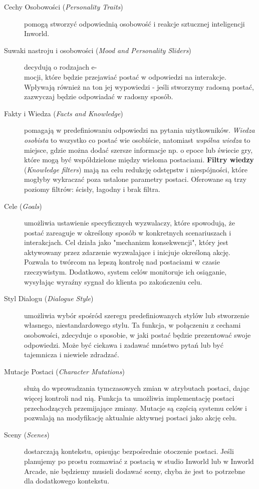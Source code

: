 \begin{description}
\item[Cechy Osobowości (\textit{Personality Traits})] pomogą stworzyć odpowiednią osobowość i reakcje sztucznej
inteligencji Inworld.

\item[Suwaki nastroju i osobowości (\textit{Mood and Personality Sliders})] decydują o rodzajach e-\\
mocji, które będzie przejawiać postać w odpowiedzi na interakcje. Wpływają również na ton jej
wypowiedzi - jeśli stworzymy radosną postać, zazwyczaj będzie odpowiadać w radosny sposób.

\item[Fakty i Wiedza (\textit{Facts and Knowledge})] pomagają w predefiniowaniu odpowiedzi na pytania użytkowników.
\textit{Wiedza osobista} to wszystko co postać wie osobiście, natomiast \textit{wspólna wiedza} to miejsce, gdzie można
dodać szersze informacje np. o epoce lub świecie gry, które mogą być współdzielone między wieloma
postaciami. \textbf{Filtry wiedzy} (\textit{Knowledge filters}) mają na celu redukcję odstępstw i niespójności, które
mogłyby wykraczać poza ustalone parametry postaci. Oferowane są trzy poziomy filtrów: ścisły,
łagodny i brak filtra.

\item[Cele (\textit{Goals})] umożliwia ustawienie specyficznych wyzwalaczy, które spowodują, że postać
zareaguje w określony sposób w konkretnych scenariuszach i interakcjach. Cel działa jako "mechanizm
konsekwencji", który jest aktywowany przez zdarzenie wyzwalające i inicjuje określoną akcję. Pozwala
to twórcom na lepszą kontrolę nad postaciami w czasie rzeczywistym. Dodatkowo, system celów
monitoruje ich osiąganie, wysyłając wyraźny sygnał do klienta po zakończeniu celu.

\item[Styl Dialogu (\textit{Dialogue Style})] umożliwia wybór spośród szeregu predefiniowanych stylów lub stworzenie
własnego, niestandardowego stylu. Ta funkcja, w połączeniu z cechami osobowości, zdecyduje o
sposobie, w jaki postać będzie prezentować swoje odpowiedzi. Może być ciekawa i zadawać mnóstwo pytań
lub być tajemnicza i niewiele zdradzać.

\item[Mutacje Postaci (\textit{Character Mutations})] służą do wprowadzania tymczasowych zmian w atrybutach
postaci, dając więcej kontroli nad nią. Funkcja ta umożliwia implementację postaci przechodzących
przemijające zmiany. Mutacje są częścią systemu celów i pozwalają na modyfikację aktualnie aktywnej
postaci jako akcję celu.

\item[Sceny (\textit{Scenes})] dostarczają kontekstu, opisując bezpośrednie otoczenie postaci. Jeśli planujemy po
prostu rozmawiać z postacią w studio Inworld lub w Inworld Arcade, nie będziemy musieli dodawać
sceny, chyba że jest to potrzebne dla dodatkowego kontekstu.

\end{description}

